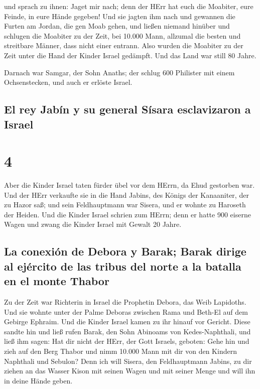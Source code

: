  und sprach zu ihnen: Jaget mir nach; denn der HErr hat
euch die Moabiter, eure Feinde, in eure Hände gegeben! Und sie jagten
ihm nach und gewannen die Furten am Jordan, die gen Moab gehen, und
ließen niemand hinüber  und schlugen die Moabiter zu der
Zeit, bei 10.000 Mann, allzumal die besten und streitbare Männer, dass
nicht einer entrann.  Also wurden die Moabiter zu der
Zeit unter die Hand der Kinder Israel gedämpft. Und das Land war still
80 Jahre.

 Darnach war Samgar, der Sohn Anaths; der schlug 600
Philister mit einem Ochsenstecken, und auch er erlöste Israel.

\hypertarget{el-rey-jabuxedn-y-su-general-suxedsara-esclavizaron-a-israel}{%
\subsection{El rey Jabín y su general Sísara esclavizaron a
Israel}\label{el-rey-jabuxedn-y-su-general-suxedsara-esclavizaron-a-israel}}

\hypertarget{section-3}{%
\section{4}\label{section-3}}

 Aber die Kinder Israel taten fürder übel vor dem HErrn,
da Ehud gestorben war.  Und der HErr verkaufte sie in die
Hand Jabins, des Königs der Kanaaniter, der zu Hazor saß; und sein
Feldhauptmann war Sisera, und er wohnte zu Haroseth der Heiden.
 Und die Kinder Israel schrien zum HErrn; denn er hatte
900 eiserne Wagen und zwang die Kinder Israel mit Gewalt 20 Jahre.

\hypertarget{la-conexiuxf3n-de-debora-y-barak-barak-dirige-al-ejuxe9rcito-de-las-tribus-del-norte-a-la-batalla-en-el-monte-thabor}{%
\subsection{La conexión de Debora y Barak; Barak dirige al ejército de
las tribus del norte a la batalla en el monte
Thabor}\label{la-conexiuxf3n-de-debora-y-barak-barak-dirige-al-ejuxe9rcito-de-las-tribus-del-norte-a-la-batalla-en-el-monte-thabor}}

 Zu der Zeit war Richterin in Israel die Prophetin Debora,
das Weib Lapidoths.  Und sie wohnte unter der Palme
Deboras zwischen Rama und Beth-El auf dem Gebirge Ephraim. Und die
Kinder Israel kamen zu ihr hinauf vor Gericht.  Diese
sandte hin und ließ rufen Barak, den Sohn Abinoams von Kedes-Naphthali,
und ließ ihm sagen: Hat dir nicht der HErr, der Gott Israels, geboten:
Gehe hin und zieh auf den Berg Thabor und nimm 10.000 Mann mit dir von
den Kindern Naphthali und Sebulon?  Denn ich will Sisera,
den Feldhauptmann Jabins, zu dir ziehen an das Wasser Kison mit seinen
Wagen und mit seiner Menge und will ihn in deine Hände geben.

